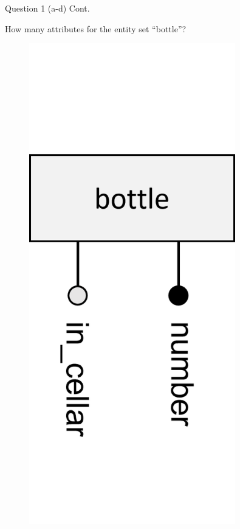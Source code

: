 \begin{frame}[fragile]{Question 1 (a-d) Cont.}
	
	How many attributes for the entity set ``bottle''?
	\begin{figure}
		\begin{columns}
			\includegraphics[width=0.8\textwidth]{t4/images/bottle_entity.png}

\end{columns}
\end{figure}
\end{frame}
